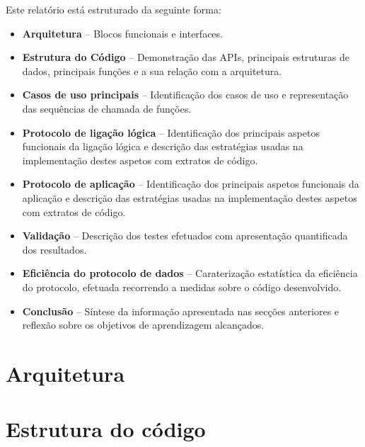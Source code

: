 \documentclass[a4paper,11pt,portuguese]{article}
\begin{document}
    Este relatório está estruturado da seguinte forma:
    \begin{itemize}
        \item \textbf{Arquitetura} -- Blocos funcionais e interfaces.
        
        \item \textbf{Estrutura do Código} -- Demonstração das APIs, principais 
        estruturas de dados, principais funções e a sua relação com a arquitetura.

        \item \textbf{Casos de uso principais} -- Identificação dos casos de uso 
        e representação das sequências de chamada de funções.

        \item \textbf{Protocolo de ligação lógica} -- Identificação dos principais
        aspetos funcionais da ligação lógica e descrição das estratégias usadas na
        implementação destes aspetos com extratos de código.

        \item \textbf{Protocolo de aplicação} -- Identificação dos principais
        aspetos funcionais da aplicação e descrição das estratégias usadas na
        implementação destes aspetos com extratos de código.

        \item \textbf{Validação} -- Descrição dos testes efetuados com apresentação
        quantificada dos resultados.

        \item \textbf{Eficiência do protocolo de dados} -- Caraterização estatística 
        da eficiência do protocolo, efetuada recorrendo a medidas sobre o código desenvolvido.

        \item \textbf{Conclusão} -- Síntese da informação apresentada nas secções
        anteriores e reflexão sobre os objetivos de aprendizagem alcançados.
        
    \end{itemize}


\section{Arquitetura}



\section{Estrutura do código}
\end{document}
